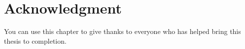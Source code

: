 \chapter*{Acknowledgment}

You can use this chapter to give thanks to everyone who has helped bring this thesis to completion.
